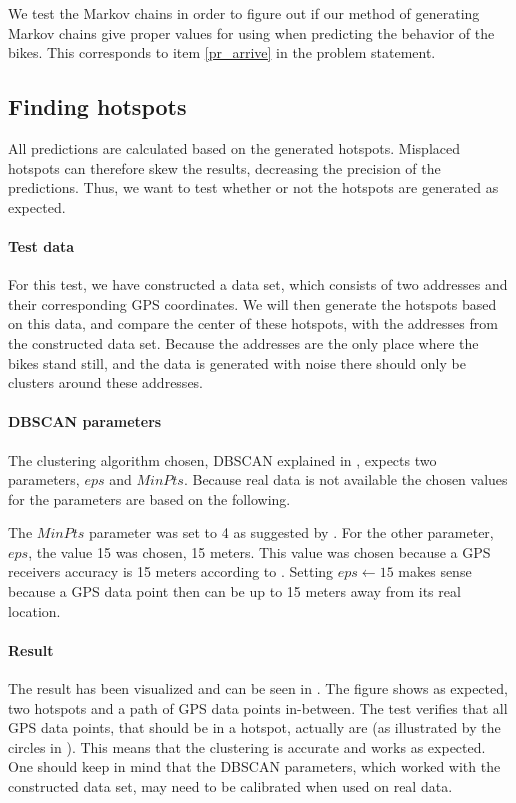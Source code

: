 We test the Markov chains in order to figure out if our method of generating Markov chains give proper values for using when predicting the behavior of the bikes.
This corresponds to item \ref{pr_arrive} in the problem statement.

\subsection{Finding hotspots}
All predictions are calculated based on the generated hotspots.
Misplaced hotspots can therefore skew the results, decreasing the precision of the predictions.
Thus, we want to test whether or not the hotspots are generated as expected.

\paragraph{Test data}
For this test, we have constructed a data set, which consists of two addresses and their corresponding GPS coordinates.
We will then generate the hotspots based on this data, and compare the center of these hotspots, with the addresses from the constructed data set.
Because the addresses are the only place where the bikes stand still, and the data is generated with noise there should only be clusters around these addresses.

\paragraph{DBSCAN parameters}
The clustering algorithm chosen, DBSCAN explained in , expects two parameters, $eps$ and $MinPts$.
Because real data is not available the chosen values for the parameters are based on the following.

The $MinPts$ parameter was set to 4 as suggested by \citet[Page 529]{pang2006introduction}.
For the other parameter, $eps$, the value 15 was chosen, 15 meters.
This value was chosen because a GPS receivers accuracy is 15 meters according to \citet{garmingps}.
Setting $eps \leftarrow 15$ makes sense because a GPS data point then can be up to 15 meters away from its real location.


\paragraph{Result}
The result has been visualized and can be seen in .
The figure shows as expected, two hotspots and a path of GPS data points in-between.
The test verifies that all GPS data points, that should be in a hotspot, actually are (as illustrated by the circles in ).
This means that the clustering is accurate and works as expected.
One should keep in mind that the DBSCAN parameters, which worked with the constructed data set, may need to be calibrated when used on real data.

